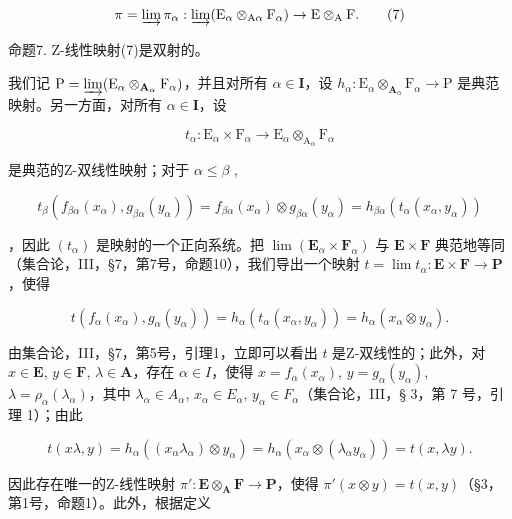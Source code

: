 \[
\pi = \varinjlim \pi_ {\alpha}: \varinjlim (\mathrm{E} _ {\alpha} \otimes_ {\mathrm{A} \alpha} \mathrm{F} _ {\alpha}) \rightarrow \mathrm{E} \otimes_ {\mathrm{A}} \mathrm{F}.\tag{7}
\]

命题7. Z-线性映射(7)是双射的。

我们记 \(\mathrm{P} = \varinjlim (\mathrm{E}_{\alpha}\otimes_{\mathbf{A}_{\alpha}}\mathrm{F}_{\alpha})\)，并且对所有 \(\alpha \in \mathbf{I}\)，设 \(h_\alpha : \mathrm{E}_\alpha \otimes_{\mathbf{A}_\alpha}\mathrm{F}_\alpha \to \mathrm{P}\) 是典范映射。另一方面，对所有 \(\alpha \in \mathbf{I}\)，设

\[
t _ {\alpha}: \mathrm{E} _ {\alpha} \times \mathrm{F} _ {\alpha} \rightarrow \mathrm{E} _ {\alpha} \otimes_ {\mathrm{A} _ {\alpha}} \mathrm{F} _ {\alpha}
\]

是典范的Z-双线性映射；对于 \(\alpha \leqslant \beta\) ,

\[
t _ {\beta} \left(f _ {\beta \alpha} \left(x _ {\alpha}\right), g _ {\beta \alpha} \left(y _ {\alpha}\right)\right) = f _ {\beta \alpha} \left(x _ {\alpha}\right) \otimes g _ {\beta \alpha} \left(y _ {\alpha}\right) = h _ {\beta \alpha} \left(t _ {\alpha} \left(x _ {\alpha}, y _ {\alpha}\right)\right)
\]

，因此 \((t_{\alpha})\) 是映射的一个正向系统。把 \(\lim (\mathbf{E}_{\alpha}\times \mathbf{F}_{\alpha})\) 与 \(\mathbf{E}\times \mathbf{F}\) 典范地等同（集合论，III，§7，第7号，命题10），我们导出一个映射 \(t = \lim t_{\alpha}:\mathbf{E}\times \mathbf{F}\to \mathbf{P}\)，使得

\[
t \left(f _ {\alpha} (x _ {\alpha}), g _ {\alpha} (y _ {\alpha})\right) = h _ {\alpha} \left(t _ {\alpha} \left(x _ {\alpha}, y _ {\alpha}\right)\right) = h _ {\alpha} \left(x _ {\alpha} \otimes y _ {\alpha}\right).
\]

由集合论，III，§7，第5号，引理1，立即可以看出 \(t\) 是Z-双线性的；此外，对 \(x \in \mathbf{E}\), \(y \in \mathbf{F}\), \(\lambda \in \mathbf{A}\)，存在 \(\alpha \in I\)，使得 \(x = f_{\alpha}(x_{\alpha})\), \(y = g_{\alpha}(y_{\alpha})\), \(\lambda = \rho_{\alpha}(\lambda_{\alpha})\)，其中 \(\lambda_{\alpha} \in A_{\alpha}\), \(x_{\alpha} \in E_{\alpha}\), \(y_{\alpha} \in F_{\alpha}\)（集合论，III，§ 3，第 7 号，引理 1）；由此

\[
t (x \lambda , y) = h _ {\alpha} ((x _ {\alpha} \lambda_ {\alpha}) \otimes y _ {\alpha}) = h _ {\alpha} (x _ {\alpha} \otimes (\lambda_ {\alpha} y _ {\alpha})) = t (x, \lambda y).
\]

因此存在唯一的Z-线性映射 \(\pi':\mathbf{E} \otimes_{\mathbf{A}} \mathbf{F} \to \mathbf{P}\)，使得 \(\pi'(x \otimes y) = t(x, y)\)（§3，第1号，命题1）。此外，根据定义

